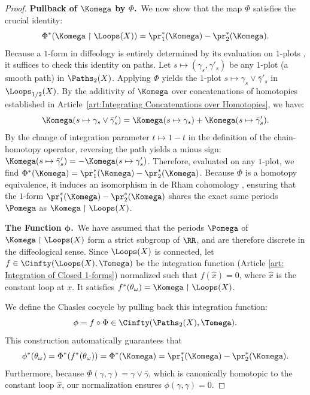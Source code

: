 \begin{proof}
  \textbf{Pullback of $\Komega$ by $\Phi$.}~We now show that the map $\Phi$ satisfies the crucial identity:
  \[
    \Phi^*(\Komega \restriction \Loops(X)) = \pr_1^*(\Komega) - \pr_2^*(\Komega).
    \]
  Because a $1$-form in diffeology is entirely determined by its evaluation on $1$-plots \cite[]{PIZ13},
  it suffices to check this identity on paths.
  Let $s \mapsto (\gamma_s, \gamma'_s)$ be any $1$-plot (a smooth path) in $\Paths_2(X)$.
  Applying $\Phi$ yields the $1$-plot $s \mapsto \gamma_s \vee \bar\gamma'_s$ in $\Loops_{1/2}(X)$.
  By the additivity of $\Komega$ over concatenations of homotopies established in Article~\ref{art:Integrating Concatenations over Homotopies},
  we have:
  \[
    \Komega(s \mapsto \gamma_s \vee \bar\gamma'_s) = \Komega(s \mapsto \gamma_s) + \Komega(s \mapsto \bar\gamma'_s).
    \]
  By the change of integration parameter $t \mapsto 1-t$ in the definition of the chain-homotopy operator,
  reversing the path yields a minus sign:
  $\Komega(s \mapsto \bar\gamma'_s) = - \Komega(s \mapsto \gamma'_s)$.
  Therefore,
  evaluated on any $1$-plot,
  we find $\Phi^*(\Komega) = \pr_1^*(\Komega) - \pr_2^*(\Komega)$.
  Because $\Phi$ is a homotopy equivalence,
  it induces an isomorphism in de Rham cohomology \cite[]{PIZ13},
  ensuring that the $1$-form $\pr_1^*(\Komega) - \pr_2^*(\Komega)$ shares the exact same periods $\Pomega$ as $\Komega \restriction \Loops(X)$.
  
  \textbf{The Function $\pmb{\phi}$.}~We have assumed that the periods $\Pomega$ of $\Komega \restriction \Loops(X)$ form a strict subgroup of $\RR$,
  and are therefore discrete in the diffeological sense.
  Since $\Loops(X)$ is connected,
  let $f \in \Cinfty(\Loops(X),\Tomega)$ be the integration function (Article \ref{art: Integration of Closed 1-forms}) normalized such that $f(\hat{x}) = 0$,
  where $\hat{x}$ is the constant loop at $x$.
  It satisfies $f^*(\theta_\omega) = \Komega \restriction \Loops(X)$.
  
  We define the Chasles cocycle by pulling back this integration function:
  \[
    \phi = f \circ \Phi \in \Cinfty(\Paths_2(X), \Tomega).
    \]
  This construction automatically guarantees that
  \[
    \phi^*(\theta_\omega) = \Phi^*(f^*(\theta_\omega)) = \Phi^*(\Komega) = \pr_1^*(\Komega) - \pr_2^*(\Komega).
    \]
  Furthermore,
  because $\Phi(\gamma,\gamma) = \gamma \vee \bar\gamma$,
  which is canonically homotopic to the constant loop $\hat{x}$,
  our normalization ensures $\phi(\gamma,\gamma) = 0$.
  

\end{proof}
